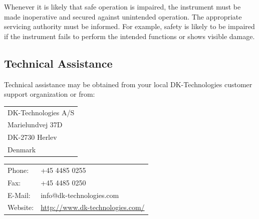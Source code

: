 Whenever it is likely that safe operation is impaired, the instrument must be made inoperative and secured against unintended operation. The appropriate servicing authority must be informed. For example, safety is likely to be impaired if the instrument fails to perform the intended functions or shows visible damage.

\begin{center}
\end{center}

\subsection{Technical Assistance}
Technical assistance may be obtained from your local DK-Technologies customer support organization or from:

\begin{tabular}{@{}l}
{\large DK-Technologies A/S }\\
Marielundvej 37D\\
DK-2730 Herlev\\
Denmark\\
\end{tabular}

\begin{tabular}{@{}l l}
Phone: & +45 4485 0255\\
Fax: & +45 4485 0250\\
E-Mail: & info@dk-technologies.com\\
Website: & \href{http://www.dk-technologies.com}{http://www.dk-technologies.com/}\\
\end{tabular}